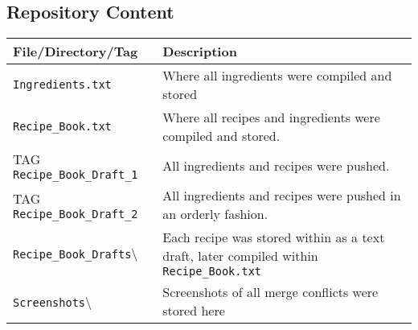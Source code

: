 \documentclass[a4paper,twoside,12pt]{article}
\begin{document}
\subsection{Repository Content}
\begin{center}
	\renewcommand{\arraystretch}{1.25}
	\begin{tabular}{ | l | p{7.5cm} |}
		\hline
		File/Directory/Tag & Description \\ \hline
		\texttt{Ingredients.txt} & Where all ingredients were compiled and stored \\ \hline
		\texttt{Recipe\_Book.txt} & Where all recipes and ingredients were compiled and stored. \\ \hline
		TAG \texttt{Recipe\_Book\_Draft\_1} & All ingredients and recipes were pushed. \\ \hline
		TAG \texttt{Recipe\_Book\_Draft\_2} & All ingredients and recipes were pushed in an orderly fashion. \\ \hline
		\texttt{Recipe\_Book\_Drafts}\textbackslash & Each recipe was  stored within as a text draft, later compiled within \texttt{Recipe\_Book.txt} \\ \hline
		\texttt{Screenshots}\textbackslash & Screenshots of all merge conflicts were stored here \\ \hline
	\end{tabular}
\end{center}

\begin{comment}
\subsection{Making use of GitHub Front-End Functionality}
\paragraph{GitHub offers extra features, which were explored to further aid development of the assignment}
\subsubsection{Using Markdown for \texttt{README}}
\paragraph{The Markdown Integration built in GitHub, allowed for features, most significantly Tables \& Task Lists, that helped in defining the objectives required to complete the assignment}
\subsubsection{Using Issues to Resolve Obstacles}
\paragraph{Issues were used to put forward problems that came about, while using Git. Issues opened included the requirement for team members and difficulties in creating a merge conflict.}
\end{comment}
\end{document}
